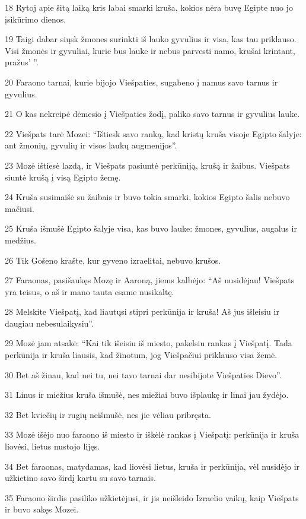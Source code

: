 \par 18 Rytoj apie šitą laiką kris labai smarki kruša, kokios nėra buvę Egipte nuo jo įsikūrimo dienos. 
\par 19 Taigi dabar siųsk žmones surinkti iš lauko gyvulius ir visa, kas tau priklauso. Visi žmonės ir gyvuliai, kurie bus lauke ir nebus parvesti namo, krušai krintant, pražus’ ”. 
\par 20 Faraono tarnai, kurie bijojo Viešpaties, sugabeno į namus savo tarnus ir gyvulius. 
\par 21 O kas nekreipė dėmesio į Viešpaties žodį, paliko savo tarnus ir gyvulius lauke. 
\par 22 Viešpats tarė Mozei: “Ištiesk savo ranką, kad kristų kruša visoje Egipto šalyje: ant žmonių, gyvulių ir visos laukų augmenijos”. 
\par 23 Mozė ištiesė lazdą, ir Viešpats pasiuntė perkūniją, krušą ir žaibus. Viešpats siuntė krušą į visą Egipto žemę. 
\par 24 Kruša susimaišė su žaibais ir buvo tokia smarki, kokios Egipto šalis nebuvo mačiusi. 
\par 25 Kruša išmušė Egipto šalyje visa, kas buvo lauke: žmones, gyvulius, augalus ir medžius. 
\par 26 Tik Gošeno krašte, kur gyveno izraelitai, nebuvo krušos. 
\par 27 Faraonas, pasišaukęs Mozę ir Aaroną, jiems kalbėjo: “Aš nusidėjau! Viešpats yra teisus, o aš ir mano tauta esame nusikaltę. 
\par 28 Melskite Viešpatį, kad liautųsi stipri perkūnija ir kruša! Aš jus išleisiu ir daugiau nebesulaikysiu”. 
\par 29 Mozė jam atsakė: “Kai tik išeisiu iš miesto, pakelsiu rankas į Viešpatį. Tada perkūnija ir kruša liausis, kad žinotum, jog Viešpačiui priklauso visa žemė. 
\par 30 Bet aš žinau, kad nei tu, nei tavo tarnai dar nesibijote Viešpaties Dievo”. 
\par 31 Linus ir miežius kruša išmušė, nes miežiai buvo išplaukę ir linai jau žydėjo. 
\par 32 Bet kviečių ir rugių neišmušė, nes jie vėliau pribręsta. 
\par 33 Mozė išėjo nuo faraono iš miesto ir iškėlė rankas į Viešpatį: perkūnija ir kruša liovėsi, lietus nustojo lijęs. 
\par 34 Bet faraonas, matydamas, kad liovėsi lietus, kruša ir perkūnija, vėl nusidėjo ir užkietino savo širdį kartu su savo tarnais. 
\par 35 Faraono širdis pasiliko užkietėjusi, ir jis neišleido Izraelio vaikų, kaip Viešpats ir buvo sakęs Mozei.



